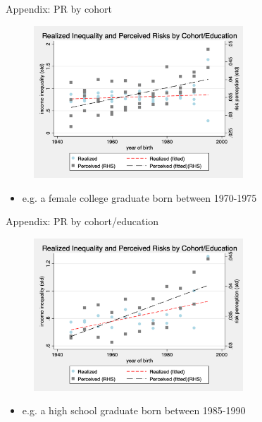 \documentclass{beamer}
\begin{document}
\begin{frame}{Appendix: PR by cohort}
	\begin{figure}[ht]
		\label{appendix:cohort_compare_figure}
		\centering
		\includegraphics[width=0.7\textwidth]{figures/real_log_wage_shk_by_byear_5yr_edu_gender_compare.png}
	\end{figure}
	\begin{itemize}
		\item e.g. a female college graduate born between 1970-1975   \quad  \hyperlink{cohort_compare}{} 
	\end{itemize}
\end{frame}


\begin{frame}{Appendix: PR by cohort/education}
	\begin{figure}[ht]
		\label{appendix1:cohort_edu_compare_figure}
		\centering
		\includegraphics[width=0.7\textwidth]{figures/real_log_wage_shk_by_byear_5yr_edu_compare.png}
	\end{figure}
	\begin{itemize}
		\item e.g. a high school graduate born between 1985-1990  \quad  \hyperlink{cohort_compare}{} 
	\end{itemize}
\end{frame}
\end{document}
